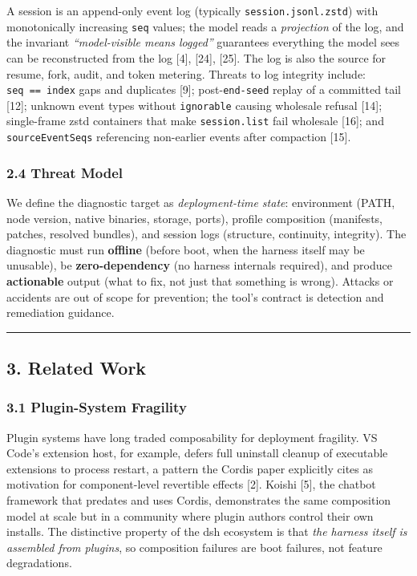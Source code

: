 \documentclass[
]{article}
\begin{document}
A session is an append-only event log (typically
\texttt{session.jsonl.zstd}) with monotonically increasing \texttt{seq}
values; the model reads a \emph{projection} of the log, and the
invariant \emph{``model-visible means logged''} guarantees everything
the model sees can be reconstructed from the log {[}4{]}, {[}24{]},
{[}25{]}. The log is also the source for resume, fork, audit, and token
metering. Threats to log integrity include: \texttt{seq\ ==\ index} gaps
and duplicates {[}9{]}; post-\texttt{end-seed} replay of a committed
tail {[}12{]}; unknown event types without \texttt{ignorable} causing
wholesale refusal {[}14{]}; single-frame zstd containers that make
\texttt{session.list} fail wholesale {[}16{]}; and
\texttt{sourceEventSeqs} referencing non-earlier events after compaction
{[}15{]}.

\subsubsection{2.4 Threat Model}\label{threat-model}

We define the diagnostic target as \emph{deployment-time state}:
environment (PATH, node version, native binaries, storage, ports),
profile composition (manifests, patches, resolved bundles), and session
logs (structure, continuity, integrity). The diagnostic must run
\textbf{offline} (before boot, when the harness itself may be unusable),
be \textbf{zero-dependency} (no harness internals required), and produce
\textbf{actionable} output (what to fix, not just that something is
wrong). Attacks or accidents are out of scope for prevention; the tool's
contract is detection and remediation guidance.

\begin{center}\rule{0.5\linewidth}{0.5pt}\end{center}

\subsection{3. Related Work}\label{related-work}

\subsubsection{3.1 Plugin-System
Fragility}\label{plugin-system-fragility}

Plugin systems have long traded composability for deployment fragility.
VS Code's extension host, for example, defers full uninstall cleanup of
executable extensions to process restart, a pattern the Cordis paper
explicitly cites as motivation for component-level revertible effects
{[}2{]}. Koishi {[}5{]}, the chatbot framework that predates and uses
Cordis, demonstrates the same composition model at scale but in a
community where plugin authors control their own installs. The
distinctive property of the dsh ecosystem is that \emph{the harness
itself is assembled from plugins}, so composition failures are boot
failures, not feature degradations.
\end{document}

